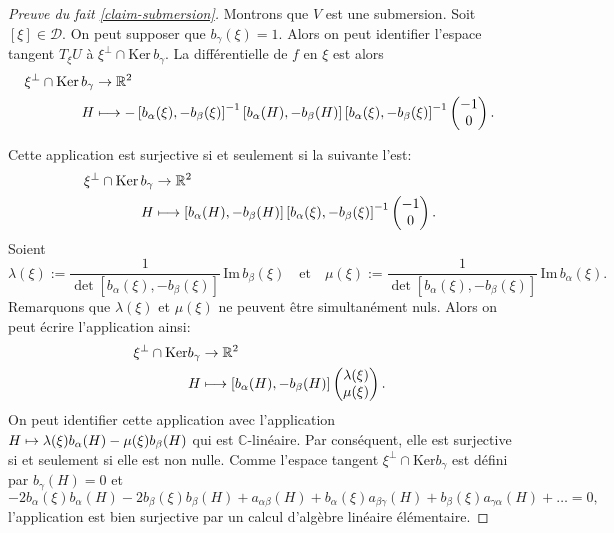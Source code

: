 \documentclass[JEP,XML,SOM,Unicode,francais,published]{cedram}
\newcommand\mto{\mathchoice{\longmapsto}{\mapsto}{\mapsto}{\mapsto}}
\newcommand{\R}{\mathbb{R}}
\newcommand{\C}{\mathbb{C}}
\theoremstyle{definition}
\begin{document}
\begin{proof}[Preuve du fait \ref{claim-submersion}]
Montrons que $V$ est une submersion. Soit $[\xi] \in \mathscr{D}$. On peut supposer que $b_{\gamma}(\xi) = 1$. Alors on peut identifier l'espace tangent $T_\xi U$ à $\xi^{\perp}\cap \mathrm{Ker}\,b_{\gamma}$. La différentielle de $f$ en $\xi$ est alors
\begin{align*}
\xi^{\perp}\cap \mathrm{Ker}\,b_{\gamma}&\to \R^2\\
H &\mto -\left[b_{\alpha}(\xi), -b_{\beta}(\xi)\right]^{-1}\left[b_{\alpha}(H), -b_{\beta}(H)\right]\left[b_{\alpha}(\xi), -b_{\beta}(\xi)\right]^{-1}\begin{pmatrix}-1 \\ 0\end{pmatrix}.
\end{align*}

Cette application est surjective si et seulement si la suivante l'est:
\begin{align*}
\xi^{\perp}\cap \mathrm{Ker}\,b_{\gamma}&\to \R^2\\
H &\mto \left[b_{\alpha}(H), -b_{\beta}(H)\right]\left[b_{\alpha}(\xi), -b_{\beta}(\xi)\right]^{-1}\begin{pmatrix}-1 \\ 0\end{pmatrix}.
\end{align*}
Soient
\[
\lambda(\xi):= \frac{1}{\det[b_\alpha(\xi), -b_\beta(\xi)]}\,\mathrm{Im}\,b_\beta(\xi)\quad\text{et}\quad \mu(\xi):= \frac{1}{\det[b_\alpha(\xi), -b_\beta(\xi)]}\,\mathrm{Im}\,b_\alpha(\xi). 
\]
Remarquons que $\lambda(\xi)$ et $\mu(\xi)$ ne peuvent être simultanément nuls. Alors on peut écrire l'application ainsi:
\begin{align*}
\xi^{\perp}\cap \mathrm{Ker} b_{\gamma}&\to \R^2\\
H &\mto \left[b_{\alpha}(H), -b_{\beta}(H)\right]\begin{pmatrix}\lambda(\xi) \\ \mu(\xi)\end{pmatrix}.
\end{align*}
On peut identifier cette application avec l'application $H \mto \lambda(\xi)b_{\alpha}(H) - \mu(\xi)b_{\beta}(H)$ qui est $\C$-linéaire. Par conséquent, elle est surjective si et seulement si elle est non nulle. Comme l'espace tangent $\xi^{\perp}\cap \mathrm{Ker} b_{\gamma}$ est défini par $b_\gamma(H) = 0$ et
\[- 2b_\alpha(\xi)b_\alpha(H) - 2b_\beta(\xi)b_\beta(H) + a_{\alpha\beta}(H)+
b_\alpha(\xi)a_{\beta\gamma}(H) + b_\beta(\xi)a_{\gamma\alpha}(H) + \ldots = 0,\]l'application est bien surjective par un calcul d'algèbre linéaire élémentaire.
\end{proof}
\end{document}
